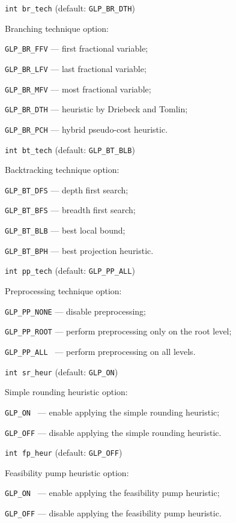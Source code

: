 {\tt int br\_tech} (default: {\tt GLP\_BR\_DTH})

Branching technique option:

\verb|GLP_BR_FFV| --- first fractional variable;

\verb|GLP_BR_LFV| --- last fractional variable;

\verb|GLP_BR_MFV| --- most fractional variable;

\verb|GLP_BR_DTH| --- heuristic by Driebeck and Tomlin;

\verb|GLP_BR_PCH| --- hybrid pseudo-cost heuristic.

\bigskip\vspace*{-2pt}

{\tt int bt\_tech} (default: {\tt GLP\_BT\_BLB})

Backtracking technique option:

\verb|GLP_BT_DFS| --- depth first search;

\verb|GLP_BT_BFS| --- breadth first search;

\verb|GLP_BT_BLB| --- best local bound;

\verb|GLP_BT_BPH| --- best projection heuristic.

\bigskip\vspace*{-2pt}

{\tt int pp\_tech} (default: {\tt GLP\_PP\_ALL})

Preprocessing technique option:

\verb|GLP_PP_NONE| --- disable preprocessing;

\verb|GLP_PP_ROOT| --- perform preprocessing only on the root level;

\verb|GLP_PP_ALL | --- perform preprocessing on all levels.

\bigskip\vspace*{-2pt}

{\tt int sr\_heur} (default: {\tt GLP\_ON})

Simple rounding heuristic option:

\verb|GLP_ON | --- enable applying the simple rounding heuristic;

\verb|GLP_OFF| --- disable applying the simple rounding heuristic.

\newpage

{\tt int fp\_heur} (default: {\tt GLP\_OFF})

Feasibility pump heuristic option:

\verb|GLP_ON | --- enable applying the feasibility pump heuristic;

\verb|GLP_OFF| --- disable applying the feasibility pump heuristic.

